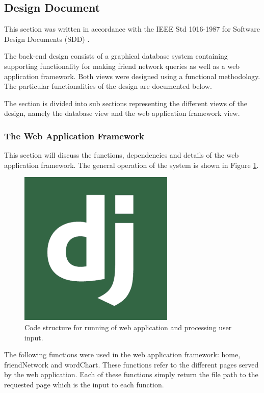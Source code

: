 \documentclass[12pt,onecolumn]{article}
\begin{document}
	\subsection{Design Document} %
	This section was written in accordance with the IEEE Std 1016-1987 for Software Design Documents (SDD) \cite{IEEE}. 
	
	The back-end design consists of a graphical database system containing supporting functionality for making friend network queries as well as a web application framework. Both views were designed using a functional methodology. The particular functionalities of the design are documented below.
	
	The section is divided into sub sections representing the different views of the design, namely the database view and the web application framework view.
	
	\subsubsection{The Web Application Framework}
	This section will discuss the functions, dependencies and details of the web application framework. The general operation of the system is shown in Figure \ref{fig:django}.
	
	\begin{figure}[htb] 
		\centering
		\includegraphics[scale=1]{django}
		\caption{Code structure for running of web application and processing user input.} \label{fig:django}
	\end{figure}
	
	The following functions were used in the web application framework: home, friendNetwork and wordChart. These functions refer to the different pages served by the web application. Each of these functions simply return the file path to the requested page which is the input to each function.
	
\end{document}
